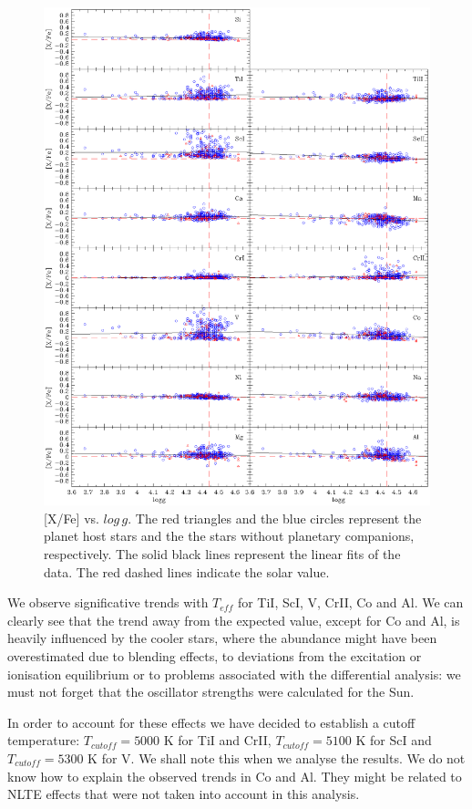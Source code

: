 \documentclass[dvips,12pt,a4paper]{report}
\begin{document}
{{\begin{figure}[h!]
\includegraphics[trim=0cm 1.5cm 0cm 1cm,clip,width=16 cm]{pics/parte3/xfelogg.eps}
\caption[depois]{[X/Fe] vs. $log\,g$. The red triangles and the blue circles represent the planet host stars and the the stars without planetary companions, respectively. The solid black lines represent the linear fits of the data. The red dashed lines indicate the solar value.}
\label{xfelogg}
\end{figure}
We observe significative trends with $T_{eff}$ for TiI, ScI, V, CrII, Co and Al. We can clearly see that the trend away from the expected value, except for Co and Al, is heavily influenced by the cooler stars, where the abundance might have been overestimated due to blending effects, to deviations from the excitation or ionisation equilibrium or to problems associated with the differential analysis: we must not forget that the oscillator strengths were calculated for the Sun.

In order to account for these effects we have decided to establish a cutoff temperature: $T_{cutoff}=5000$ K for TiI and CrII, $T_{cutoff}=5100$ K for ScI and $T_{cutoff}=5300$ K for V. We shall note this when we analyse the results. We do not know how to explain the observed trends in Co and Al. They might be related to NLTE effects that were not taken into account in this analysis.

}}
\end{document}
